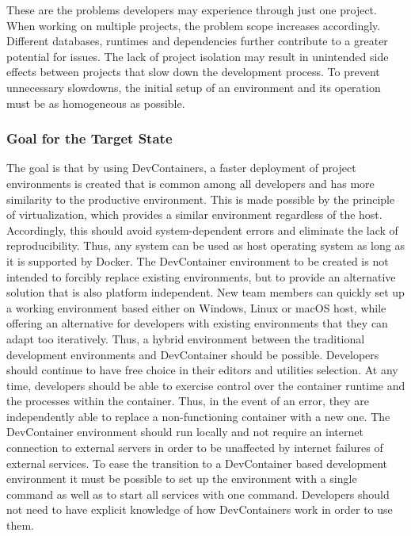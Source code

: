         These are the problems developers may experience through just one project. When working on multiple projects, the problem scope increases accordingly. Different databases, runtimes and dependencies further contribute to a greater potential for issues. The lack of project isolation may result in unintended side effects between projects that slow down the development process. To prevent unnecessary slowdowns, the initial setup of an environment and its operation must be as homogeneous as possible.

        \subsubsection{Goal for the Target State}\label{sssec::goal}
        The goal is that by using DevContainers, a faster deployment of project environments is created that is common among all developers and has more similarity to the productive environment. This is made possible by the principle of virtualization, which provides a similar environment regardless of the host. Accordingly, this should avoid system-dependent errors and eliminate the lack of reproducibility. Thus, any system can be used as host operating system as long as it is supported by Docker. The DevContainer environment to be created is not intended to forcibly replace existing environments, but to provide an alternative solution that is also platform independent. New team members can quickly set up a working environment based either on Windows, Linux or macOS host, while offering an alternative for developers with existing environments that they can adapt too iteratively. Thus, a hybrid environment between the traditional development environments and DevContainer should be possible. Developers should continue to have free choice in their editors and utilities selection.\newline
        At any time, developers should be able to exercise control over the container runtime and the processes within the container. Thus, in the event of an error, they are independently able to replace a non-functioning container with a new one. The DevContainer environment should run locally and not require an internet connection to external servers in order to be unaffected by internet failures of external services. To ease the transition to a DevContainer based development environment it must be possible to set up the environment with a single command as well as to start all services with one command. Developers should not need to have explicit knowledge of how DevContainers work in order to use them.

